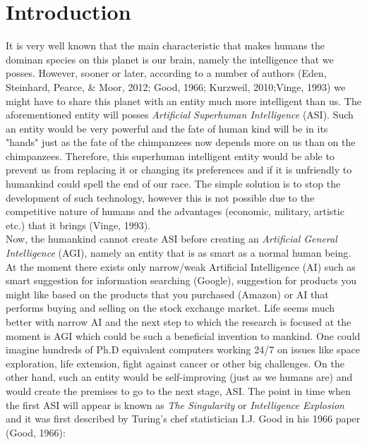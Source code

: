 \documentclass[11pt]{article}
\begin{document}
\section*{Introduction}
	It is very well known that the main characteristic that makes humans the dominan species on this planet is our brain, namely the intelligence that we posses. However, sooner or later, according to a number of authors (Eden, Steinhard, Pearce, \& Moor, 2012;  Good, 1966; Kurzweil, 2010;Vinge, 1993)  we might have to share this planet with an entity  much more intelligent than us. The aforementioned entity will posses \textit{Artificial Superhuman Intelligence} (ASI). Such an entity would be very powerful and the fate of human kind will be in its "hands" just as the fate of the chimpanzees now depends more on us than on the chimpanzees. Therefore, this superhuman intelligent entity would be able to prevent us from replacing it or changing its preferences and if it is unfriendly to humankind could spell the end of our race. The simple solution is to stop the development of such technology, however this is not possible due to the competitive nature of humans and the advantages (economic, military, artistic etc.) that it brings (Vinge, 1993). \\
	
	\indent
	Now, the humankind cannot create ASI before creating an \textit{Artificial General Intelligence} (AGI), namely  an entity that is as smart as a normal human being. At the moment there exists only narrow/weak Artificial Intelligence (AI) such as smart suggestion for information searching (Google), suggestion for products you might like based on the products that you purchased (Amazon) or AI that performs buying and selling on the stock exchange market. Life seems much better with narrow AI and the next step to which the research is focused at the moment is AGI which could be such a beneficial invention to mankind. One could imagine hundreds of Ph.D equivalent computers working 24/7 on issues like space exploration, life extension, fight against cancer or other big challenges. On the other hand, such an entity would be self-improving (just as we humans are) and would create the premises to go to the next stage, ASI. The point in time when the first ASI will appear is known as \textit {The Singularity} or \textit{Intelligence Explosion}  and it was first described by Turing's chef statistician I.J. Good in his 1966 paper (Good, 1966):
\end{document}
